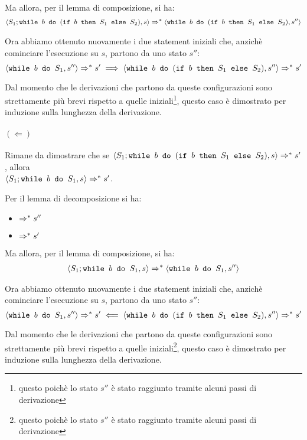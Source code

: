 Ma allora, per il lemma di composizione, si ha:
\begin{align*}
\confSs{S_1; \wbS{b}{(\ifABC{b}{S_1}{S_2})}}{s}
\Rar{*}
\confSs{\wbS{b}{(\ifABC{b}{S_1}{S_2})}}{s''}
\end{align*}

Ora abbiamo ottenuto nuovamente i due statement iniziali che, anzichè
cominciare l'esecuzione su $s$, partono da uno stato $s''$:
$$
\confSs{\wbS{b}{S_1}}{s''} \Rar{*} s'
  \implies
\confSs{\wbS{b}{(\ifABC{b}{S_1}{S_2})}}{s''} \Rar{*} s'
$$

Dal momento che le derivazioni che partono da queste configurazioni sono
strettamente più brevi rispetto a quelle iniziali\footnote{questo poichè lo
stato $s''$ è stato raggiunto tramite alcuni passi di derivazione}, questo
caso è dimostrato per induzione sulla lunghezza della derivazione.

\paragraph{$(\Leftarrow)$}

Rimane da dimostrare che se
$\confSs{S_1; \wbS{b}{(\ifABC{b}{S_1}{S_2})}}{s} \Rar{*} s'$, allora \\
$\confSs{S_1; \wbS{b}{S_1}}{s} \Rar{*} s'$.

Per il lemma di decomposizione si ha:
\begin{itemize}
  \item {} $\Rar{*} s''$
  \item {} $\Rar{*} s'$
\end{itemize}

Ma allora, per il lemma di composizione, si ha:
\begin{align*}
\confSs{S_1; \wbS{b}{S_1}}{s}
\Rar{*}
\confSs{\wbS{b}{S_1}}{s''}
\end{align*}

Ora abbiamo ottenuto nuovamente i due statement iniziali che, anzichè
cominciare l'esecuzione su $s$, partono da uno stato $s''$:
$$
\confSs{\wbS{b}{S_1}}{s''} \Rar{*} s'
  \impliedby
\confSs{\wbS{b}{(\ifABC{b}{S_1}{S_2})}}{s''} \Rar{*} s'
$$

Dal momento che le derivazioni che partono da queste configurazioni sono
strettamente più brevi rispetto a quelle iniziali\footnote{questo poichè lo
stato $s''$ è stato raggiunto tramite alcuni passi di derivazione}, questo
caso è dimostrato per induzione sulla lunghezza della derivazione.

\cvd


